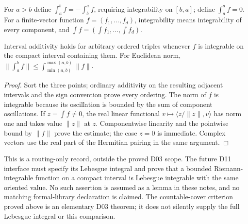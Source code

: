 \begin{definition}
For $a>b$ define $\int_a^bf=-\int_b^af$, requiring integrability on
$[b,a]$; define $\int_a^af=0$. For a finite-vector function
$f=(f_1,\ldots,f_d)$, integrability means integrability of every component,
and $\int f=(\int f_1,\ldots,\int f_d)$.
\end{definition}
\begin{proposition}
Interval additivity holds for arbitrary ordered triples whenever $f$ is
integrable on the compact interval containing them. For Euclidean norm,
$\|\int_a^bf\|\le\int_{\min(a,b)}^{\max(a,b)}\|f\|$.
\end{proposition}
\begin{proof}
Sort the three points; ordinary additivity on the resulting adjacent
intervals and the sign convention prove every ordering. The norm of $f$
is integrable because its oscillation is bounded by the sum of component
oscillations. If $z=\int f\ne0$, the real linear functional
$v\mapsto\langle z/\|z\|,v\rangle$ has norm one and takes value
$\|z\|$ at $z$. Componentwise linearity and the pointwise bound by
$\|f\|$ prove the estimate; the case $z=0$ is immediate. Complex
vectors use the real part of the Hermitian pairing in the same argument.
\end{proof}

\begin{remark}
This is a routing-only record, outside the proved D03 scope. The future
D11 interface must specify its Lebesgue integral and prove that a bounded
Riemann-integrable function on a compact interval is Lebesgue integrable
with the same oriented value. No such assertion is assumed as a lemma
in these notes, and no matching formal-library declaration is claimed.
The countable-cover criterion proved above is an elementary D03 theorem;
it does not silently supply the full Lebesgue integral or this comparison.
\end{remark}
